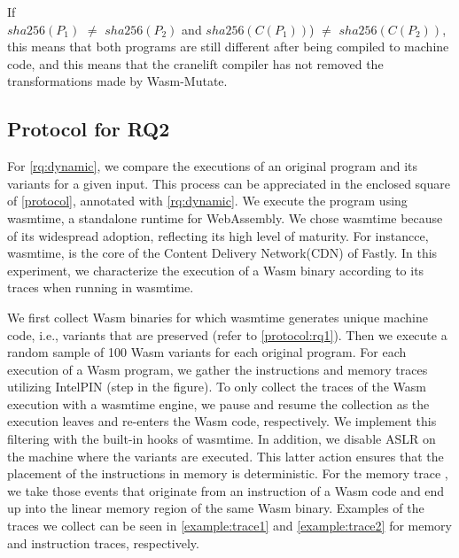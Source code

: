 \documentclass[sigplan,screen]{acmart}
\newcommand*\badge[1]{ \colorbox{red}{\color{white}#1}}
\newcommand{\tool}{{\sc Wasm-Mutate}\xspace}
\newcommand{\wasm}{Wasm\xspace}
\newcommand{\Wasm}{WebAssembly\xspace}
\newcommand*\step[1]{
\noindent\tikz[baseline=(char.base)]{
        \node[shape=circle,text=black,draw=black, fill=white,inner sep=1.2pt] (char) {#1};}}
\newcommand{\todo}[1]{%
\refstepcounter{todo}
\noindent\textbf{\badge{TODO}} {\color{red}#1}
\addcontentsline{td}{todo}
{\color{red}\thesection.\thetodo\xspace #1}}
\begin{document}
If \\ $sha256(P_1)$ $\neq$ $sha256(P_2)$ and $sha256(C(P_1))$) $\neq$ $sha256(C(P_2))$, this means that  both programs are still different after being compiled to machine code, and this means that the cranelift compiler has not removed the transformations made by \tool.  



\subsection{Protocol for RQ2}
\newcommand{\samples}{100\xspace}

For \ref{rq:dynamic}, we compare  the executions of an original program and its variants for a given input.
This process can be appreciated in the enclosed square of \autoref{protocol}, annotated with \ref{rq:dynamic}.
We execute the program using wasmtime, a standalone runtime for \Wasm. 
We chose wasmtime because of its widespread adoption, reflecting its high level of maturity.
For instancce, wasmtime, is the core of the Content Delivery Network(CDN) of Fastly.
In this experiment, we characterize the  execution of a \wasm binary according to its traces when running in wasmtime.

We first collect \wasm binaries for which wasmtime generates unique machine code, i.e., variants that are preserved (refer to \autoref{protocol:rq1}).
Then we execute a random sample of \samples \wasm variants for each original program.
For each execution of a \wasm program, we gather the instructions and memory traces utilizing IntelPIN \cite{luk2005pin, 10.1145/3478520} (step \step{4} in the figure).
To only collect the traces of the Wasm execution with a wasmtime engine, we pause and resume the collection as the execution leaves and re-enters the Wasm code, respectively.
We implement this filtering with the built-in hooks of wasmtime.
In addition, we disable ASLR on the machine where the variants are executed.
This latter action ensures that the placement of the instructions in memory is deterministic.
For the memory trace , we take those events that originate from an instruction of a Wasm code and end up into the linear memory region of the same Wasm binary.
Examples of the traces we collect can be seen in \autoref{example:trace1} and \autoref{example:trace2} for memory and instruction traces, respectively.


\end{document}
